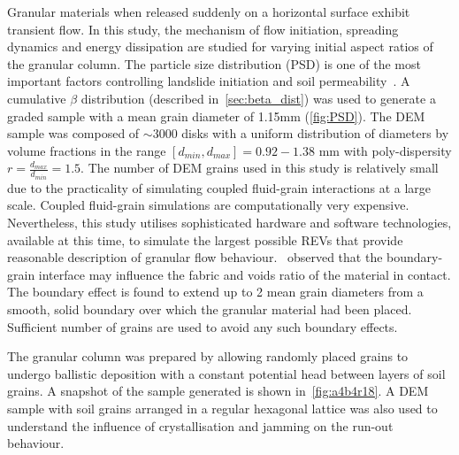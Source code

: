 Granular materials when released suddenly on a 
horizontal surface exhibit transient flow. In this study, the mechanism of flow 
initiation, spreading dynamics and energy dissipation are studied for varying 
initial aspect ratios of the granular column. The particle size distribution 
(PSD) is one of the most important factors controlling landslide initiation and 
soil permeability~\citep{Utili2014}. A cumulative $\beta$ distribution 
(described in~\cref{sec:beta_dist}) was used to generate a graded sample with a 
mean grain diameter of 1.15\si{\mm} (\cref{fig:PSD}). The DEM sample was 
composed of $\sim3000$ disks with a uniform distribution of 
diameters by volume fractions in the range $[d_{min}, d_{max}] = 0.92 - 1.38$ 
\si{\mm} with poly-dispersity $r = \frac{d_{max} }{d_{min}} = 1.5$. The number 
of DEM grains used in this study is relatively small due to the practicality of 
simulating coupled fluid-grain interactions at a large scale. Coupled 
fluid-grain simulations are computationally very expensive. Nevertheless, this 
study utilises sophisticated hardware and software technologies, available at 
this time, to simulate the largest possible REVs that provide reasonable 
description of granular flow behaviour.~\citet{Marketos2009} observed that the 
boundary-grain interface may influence the fabric and voids ratio of the 
material in contact. The boundary effect is found to extend up to 2 mean grain 
diameters from a smooth, solid boundary over which the granular material had 
been placed. Sufficient number of grains are used to avoid any such boundary 
effects. 

The granular column was prepared by allowing randomly placed grains to undergo 
ballistic deposition with a constant potential head between layers of soil 
grains. A snapshot of the sample generated is shown in~\cref{fig:a4b4r18}. A 
DEM sample with soil grains arranged in a regular hexagonal lattice was also 
used to understand the influence of crystallisation and jamming on the run-out 
behaviour. 

